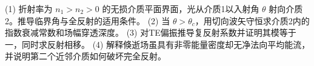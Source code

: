 (1) 折射率为 \(n_1>n_2>0\) 的无损介质平面界面，光从介质1以入射角 \(\theta\) 射向介质2。推导临界角与全反射的适用条件。
(2) 当 \(\theta>\theta_c\)，用切向波矢守恒求介质2内的指数衰减常数和场幅穿透深度。
(3) 对TE偏振推导复反射系数并证明其模等于一，同时求反射相移。
(4) 解释倏逝场虽具有非零能量密度却无净法向平均能流，并说明第二个近邻介质如何破坏完全反射。
